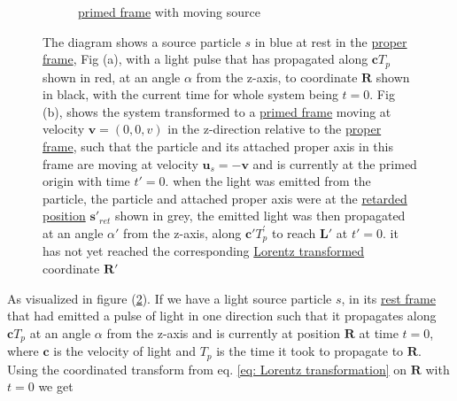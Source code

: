 \begin{figure}[H]
\begin{subfigure}{.49\textwidth}
		\caption{\hyperlink{def-Primed-Frame}{primed frame} with moving source}
		\label{fig: primed frame 1}
	\end{subfigure}
	\caption{The diagram shows a source particle $s$ in blue at rest in the \protect\hyperlink{def-proper-frame}{proper frame}, Fig (a), with a light pulse that has propagated along $\mathbf{c} T_{p}$ shown in red, at an angle $\alpha$ from the z-axis, to coordinate $\mathbf{R}$ shown in black, with the current time for whole system being $t=0$.
	Fig (b), shows the system transformed to a \protect\hyperlink{def-Primed-Frame}{primed frame} moving at velocity $\mathbf{v}=(0,0,v)$ in the z-direction relative to the \protect\hyperlink{def-proper-frame}{proper frame}, such that the particle and its attached proper axis in this frame are moving at velocity $\mathbf{u}_s= - \mathbf{v}$ and is currently at the primed origin with time $t'=0$. when the light was emitted from the particle, the particle and attached proper axis were at the \protect\hyperlink{def-retarded-position}{retarded position} $\mathbf{s}'_{ret}$ shown in grey, the emitted light was then propagated at an angle $\alpha'$ from the z-axis, along $\mathbf{c}' T^{'}_{p}$ to reach $\mathbf{L}'$ at $t'=0$. it has not yet reached the corresponding \protect\hyperlink{def-lorentz-transform}{Lorentz transformed} coordinate $\mathbf{R}'$ }
	\label{fig: Retarded field outward field transform}
\end{figure}

As visualized in figure (\ref{fig: Retarded field outward field transform}). If we have a light source particle $s$, in its \hyperlink{def-proper-frame}{rest frame} that had emitted a pulse of light in one direction such that it propagates along $\mathbf{c}T_{p}$ at an angle $\alpha$ from the z-axis and is currently at position $\mathbf{R}$ at time $t=0$, where $\mathbf{c}$ is the velocity of light and $T_{p}$ is the time it took to propagate to $\mathbf{R}$.
Using the coordinated transform from eq. \eqref{eq: Lorentz transformation} on $\mathbf{R}$ with $t=0$ we get

